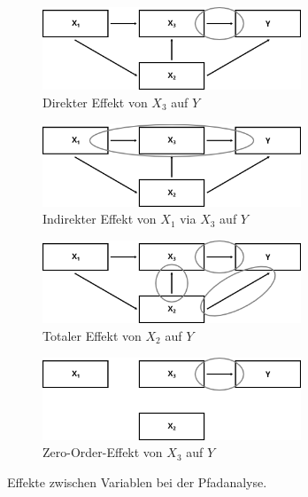 \documentclass{article}
\numberwithin{equation}{section}
\begin{document}
\begin{figure}[h]
  \centering
  \captionsetup{justification=centering}
  \begin{subfigure}[b]{0.48\textwidth}
    \centering
    \includegraphics[width=0.85\textwidth]{images/pfad-effekte/direkt.png}
    \caption{Direkter Effekt von $X_3$ auf $Y$}
  \end{subfigure}
  \begin{subfigure}[b]{0.48\textwidth}
    \centering
    \includegraphics[width=0.85\textwidth]{images/pfad-effekte/indirekt.png}
    \caption{Indirekter Effekt von $X_1$ via $X_3$ auf $Y$}
  \end{subfigure}\vspace*{0.5cm}
  
  \begin{subfigure}[b]{0.48\textwidth}
    \centering
    \includegraphics[width=0.85\textwidth]{images/pfad-effekte/total.png}
    \caption{Totaler Effekt von $X_2$ auf $Y$}
  \end{subfigure}
  \begin{subfigure}[b]{0.48\textwidth}
    \centering
    \includegraphics[width=0.85\textwidth]{images/pfad-effekte/zero-order.png}
    \caption{Zero-Order-Effekt von $X_3$ auf $Y$}
  \end{subfigure}
  \caption{Effekte zwischen Variablen bei der Pfadanalyse.}
  \label{img:pfad-effekte}
\end{figure}
\end{document}
